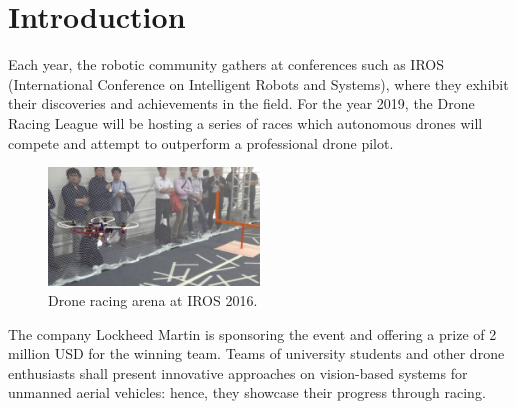 \chapter{Introduction}

Each year, the robotic community gathers at conferences such as IROS
(International Conference on Intelligent Robots and Systems), where they
exhibit their discoveries and achievements in the field. For the year 2019, the
Drone Racing League will be hosting a series of races which autonomous drones
will compete and attempt to outperform a professional drone pilot.\\

\begin{figure}[h]
	\centering
	\includegraphics[width=0.5\textwidth]{figure/iros_2016.jpg}
	\caption{Drone racing arena at IROS 2016.}
	\label{fig:iros}
\end{figure}

The company Lockheed Martin is sponsoring the event and offering a prize of 2
million USD for the winning team. Teams of university students and other drone
enthusiasts shall present innovative approaches on vision-based systems for
unmanned aerial vehicles: hence, they showcase their progress through racing.\\






